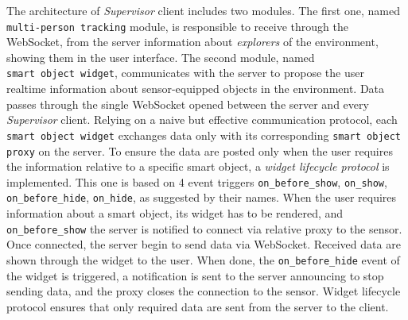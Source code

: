 The architecture of \emph{Supervisor} client includes two modules. The first
one, named {\tt multi-person\ tracking} module, is responsible to
receive through the WebSocket, from the server information about
\emph{explorers} of the environment, showing them in the user interface. The
second module, named {\tt smart\ object\ widget}, communicates with the
server to propose the user realtime information about sensor-equip\-ped
objects in the environment. Data passes through the single WebSocket
opened between the server and every \emph{Supervisor} client. Relying on a
naive but effective communication protocol, each {\tt smart object widget}
exchanges data only with its corresponding {\tt smart object proxy} on the server. To
ensure the data are posted only when the user requires the information
relative to a specific smart object, a \emph{widget lifecycle protocol} is
implemented. This one is based on 4 event triggers {\tt on\_before\_show},
{\tt on\_show}, {\tt on\_before\_hide}, {\tt on\_hide}, as suggested by their names.
When the user requires information about a smart object, its widget has
to be rendered, and {\tt on\_before\_show} the server is notified to
connect via relative proxy to the sensor. Once connected, the server
begin to send data via WebSocket. Received data are shown through the
widget to the user. When done, the {\tt on\_before\_hide} event of the
widget is triggered, a notification is sent to the server announcing to stop sending
data, and the proxy closes the connection to the sensor. Widget lifecycle
protocol ensures that only required data are sent from the server to the
client.
